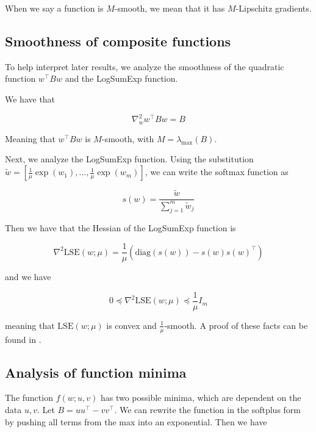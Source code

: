 \documentclass[11pt]{article}
\begin{document}
When we say a function is $M$-smooth, we mean that it has $M$-Lipschitz gradients.

\subsection{Smoothness of composite functions}
\label{sec:composite_smoothness}

To help interpret later results, we analyze the smoothness of the quadratic function $w^{\top}Bw$ and the LogSumExp function.

We have that

\begin{equation}
    \nabla_w^2 w^{\top}Bw = B
\end{equation}

Meaning that $w^{\top}Bw$ is $M$-smooth, with $M = \lambda_{\max}(B)$.

Next, we analyze the LogSumExp function. Using the substitution $\tilde{w} = [\frac{1}{\mu}\exp(w_1), ..., \frac{1}{\mu}\exp(w_m)]$, we can write the softmax function as

\begin{equation}
    s(w) = \frac{\tilde{w}}{\sum_{j=1}^{m} \tilde{w}_j}
\end{equation}

Then we have that the Hessian of the LogSumExp function is

\begin{equation}
    \nabla^2 \textrm{LSE}(w; \mu) = \frac{1}{\mu} (\textrm{diag}(s(w)) - s(w)s(w)^{\top}) 
\end{equation}

and we have

\begin{equation}
    0 \preceq \nabla^2 \textrm{LSE}(w; \mu) \preceq \frac{1}{\mu} I_m
\end{equation}

meaning that $\textrm{LSE}(w; \mu)$ is convex and $\frac{1}{\mu}$-smooth. A proof of these facts can be found in \cite{gao_properties_2018}.

\subsection{Analysis of function minima}

The function $f(w; u, v)$ has two possible minima, which are dependent on the data $u, v$. Let $B = uu^{\top} - vv^{\top}$. We can rewrite the function in the softplus form by pushing all terms from the max into an exponential. Then we have
\end{document}
